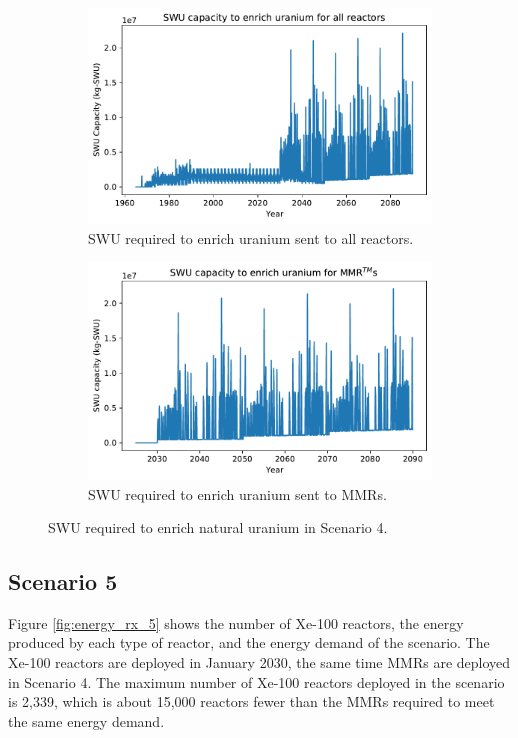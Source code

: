 \begin{figure}
    \centering
    \begin{subfigure}{0.45\textwidth}
        \centering
        \includegraphics[scale=0.4]{../figures/totalswu_scenarios_4.pdf}
        \caption{\gls{SWU} required to enrich uranium sent to all reactors.}
        \label{fig:totalswu_4}
    \end{subfigure}
    \hspace{0.8cm}
    \begin{subfigure}{0.45\textwidth}
        \centering
        \includegraphics[scale=0.4]{../figures/haleuSWU_scenarios_4.pdf}
        \caption{\gls{SWU} required to enrich uranium sent to \glspl{MMR}.}
        \label{fig:haleuswu_4}
    \end{subfigure}
    \caption{\gls{SWU} required to enrich natural uranium in Scenario 4.}
    \label{fig:swu_4}
\end{figure}


\subsection{Scenario 5}
Figure \ref{fig:energy_rx_5} shows the number of Xe-100 reactors, the 
energy produced by each type of reactor, and the energy demand of the 
scenario. The Xe-100 reactors are deployed in January 2030, the 
same time 
\glspl{MMR} are deployed in Scenario 4. The maximum number of Xe-100 
reactors deployed in the scenario is 2,339, which is about 15,000 reactors 
fewer than the \glspl{MMR} required to meet the same energy demand. 

